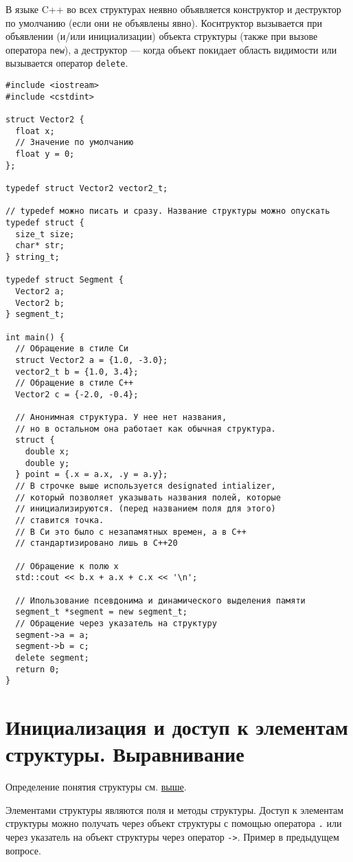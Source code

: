 {\small В языке C++ во всех структурах неявно объявляется конструктор и деструктор по умолчанию
(если они не объявлены явно). Коснтруктор вызывается при объявлении (и/или инициализации) объекта
структуры (также при вызове оператора \verb|new|), а деструктор --- когда объект покидает
область видимости или вызывается оператор \verb|delete|.}
\begin{verbatim}
#include <iostream>
#include <cstdint>

struct Vector2 {
  float x;
  // Значение по умолчанию
  float y = 0;
};

typedef struct Vector2 vector2_t;

// typedef можно писать и сразу. Название структуры можно опускать
typedef struct {
  size_t size;
  char* str;
} string_t;

typedef struct Segment {
  Vector2 a;
  Vector2 b;
} segment_t;

int main() {
  // Обращение в стиле Си
  struct Vector2 a = {1.0, -3.0};
  vector2_t b = {1.0, 3.4};
  // Обращение в стиле C++
  Vector2 c = {-2.0, -0.4};

  // Анонимная структура. У нее нет названия,
  // но в остальном она работает как обычная структура.
  struct {
    double x;
    double y;
  } point = {.x = a.x, .y = a.y};
  // В строчке выше используется designated intializer,
  // который позволяет указывать названия полей, которые
  // инициализируются. (перед названием поля для этого)
  // ставится точка.
  // В Си это было с незапамятных времен, а в C++
  // стандартизировано лишь в C++20

  // Обращение к полю x
  std::cout << b.x + a.x + c.x << '\n';
  
  // Ипользование псевдонима и динамического выделения памяти
  segment_t *segment = new segment_t;
  // Обращение через указатель на структуру
  segment->a = a;
  segment->b = c;
  delete segment;
  return 0;
}
\end{verbatim}

\section{Инициализация и доступ к элементам структуры. Выравнивание}
Определение понятия структуры см. \hyperref[def:struct]{выше}.

Элементами структуры являются поля и методы структуры.
Доступ к элементам структуры можно получать через объект структуры
с помощью оператора \verb|.| или через указатель на объект структуры через оператор \verb|->|.
Пример в предыдущем вопросе.

